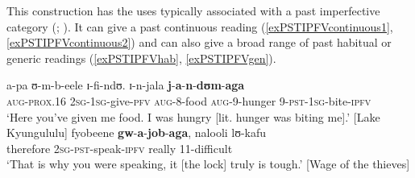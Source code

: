 \largerpage
This construction has the uses typically associated with a past imperfective category (\citealt{ComrieB1976}; \citealt{DahlOe1985}). It can give a past continuous reading (\ref{exPSTIPFVcontinuous1}, \ref{exPSTIPFVcontinuous2}) and can also give a broad range of past habitual or generic readings (\ref{exPSTIPFVhab}, \ref{exPSTIPFVgen}).
\begin{exe}
\ex \label{exPSTIPFVcontinuous1}
\gll a-pa ʊ-m-b-eele ɪ-fi-ndʊ. ɪ-n-jala \textbf{j}-\textbf{a}-\textbf{n}-\textbf{dʊm}-\textbf{aga}\\
\textsc{aug}-\textsc{prox.16} \textsc{2sg}-\textsc{1sg}-give-\textsc{pfv} \textsc{aug}-8-food \textsc{aug}-9-hunger 9-\textsc{pst}-\textsc{1sg}-bite-\textsc{ipfv}\\
\glt \lq Here you've given me food. I was hungry [lit. hunger was biting me].' [Lake Kyungululu] 
\ex \label{exPSTIPFVcontinuous2} \gll fyobeene \textbf{gw}-\textbf{a}-\textbf{job}-\textbf{aga}, nalooli lʊ-kafu\\
therefore \textsc{2sg}-\textsc{pst}-speak-\textsc{ipfv} really 11-difficult\\
\glt `That is why you were speaking, it [the lock] truly is tough.' [Wage of the thieves]


\end{exe}
